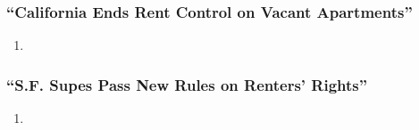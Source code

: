 \subsubsection{``California Ends Rent Control on Vacant Apartments''}

\begin{enumerate}
    \item %
\end{enumerate}

\subsubsection{``S.F. Supes Pass New Rules on Renters' Rights''}

\begin{enumerate}
    \item %
\end{enumerate}

